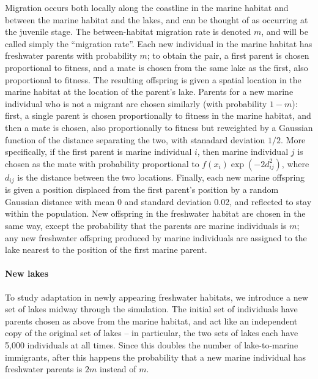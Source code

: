 \documentclass{article}
\begin{document}
Migration occurs both locally along the coastline in the marine habitat
and between the marine habitat and the lakes,
and can be thought of as occurring at the juvenile stage.
The between-habitat migration rate is denoted $m$,
and will be called simply the ``migration rate''.
Each new individual in the marine habitat has freshwater parents with probability $m$;
to obtain the pair, a first parent is chosen proportional to fitness,
and a mate is chosen from the same lake as the first, also proportional to fitness.
The resulting offspring is given a spatial location in the marine habitat
at the location of the parent's lake.
Parents for a new marine individual who is not a migrant are chosen similarly (with probability $1-m$):
first, a single parent is chosen proportionally to fitness in the marine habitat,
and then a mate is chosen, 
also proportionally to fitness but reweighted by a Gaussian function 
of the distance separating the two, with stanadard deviation $1/2$. 
More specifically, if the first parent is marine individual $i$,
then marine individual $j$ is chosen as the mate
with probability proportional to $f(x_i) \exp(-2d_{ij}^2)$,
where $d_{ij}$ is the distance between the two locations.
Finally, each new marine offspring is given a position 
displaced from the first parent's position by a random Gaussian distance
with mean 0 and standard deviation 0.02, and reflected to stay within the population.
New offspring in the freshwater habitat are chosen in the same way,
except the probability that the parents are marine individuals is $m$;
any new freshwater offspring produced by marine individuals
are assigned to the lake nearest to the position of the first marine parent.

\paragraph{New lakes}
To study adaptation in newly appearing freshwater habitats,
we introduce a new set of lakes midway through the simulation.
The initial set of individuals have parents chosen as above from the marine habitat,
and act like an independent copy of the original set of lakes -- in particular,
the two sets of lakes each have 5,000 individuals at all times.
Since this doubles the number of lake-to-marine immigrants,
after this happens the probability that a new marine individual has freshwater parents
is $2m$ instead of $m$.
\end{document}
